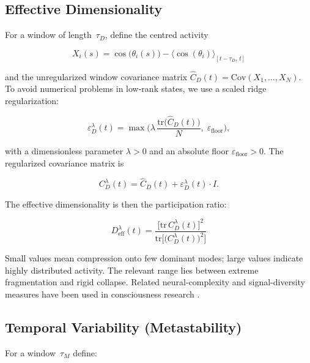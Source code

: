 \documentclass[11pt,a4paper]{article}
\theoremstyle{plain}
\theoremstyle{definition}
\theoremstyle{remark}
\newcommand{\Deff}{D_{\mathrm{eff}}}
\begin{document}
\subsection{Effective Dimensionality}

For a window of length~$\tau_D$, define the centred activity

\begin{equation}
X_i(s) = \cos\!\bigl(\theta_i(s)\bigr) - \bigl\langle\cos(\theta_i)\bigr\rangle_{[t-\tau_D,\,t]}
\end{equation}

and the unregularized window covariance matrix $\hat{C}_D(t) = \mathrm{Cov}(X_1,\ldots,X_N)$. To avoid numerical problems in low-rank states, we use a scaled ridge regularization:

\begin{equation}
\label{eq:ridge}
\varepsilon_D^{\lambda}(t) = \max\!\biggl(\lambda\,\frac{\mathrm{tr}\bigl(\hat{C}_D(t)\bigr)}{N},\;\varepsilon_{\mathrm{floor}}\biggr),
\end{equation}

with a dimensionless parameter $\lambda > 0$ and an absolute floor $\varepsilon_{\mathrm{floor}} > 0$. The regularized covariance matrix is

\begin{equation}
C_D^{\lambda}(t) = \hat{C}_D(t) + \varepsilon_D^{\lambda}(t)\cdot I.
\end{equation}

The effective dimensionality is then the participation ratio:

\begin{equation}
\label{eq:Deff}
\boxed{\;\Deff^{\lambda}(t) = \frac{\bigl[\mathrm{tr}\,C_D^{\lambda}(t)\bigr]^2}{\mathrm{tr}\!\bigl[\bigl(C_D^{\lambda}(t)\bigr)^2\bigr]}\;}
\end{equation}

Small values mean compression onto few dominant modes; large values indicate highly distributed activity. The relevant range lies between extreme fragmentation and rigid collapse. Related neural-complexity and signal-diversity measures have been used in consciousness research \citep{schartner2015,luppi2019}.

\subsection{Temporal Variability (Metastability)}

For a window~$\tau_M$ define:
\end{document}
